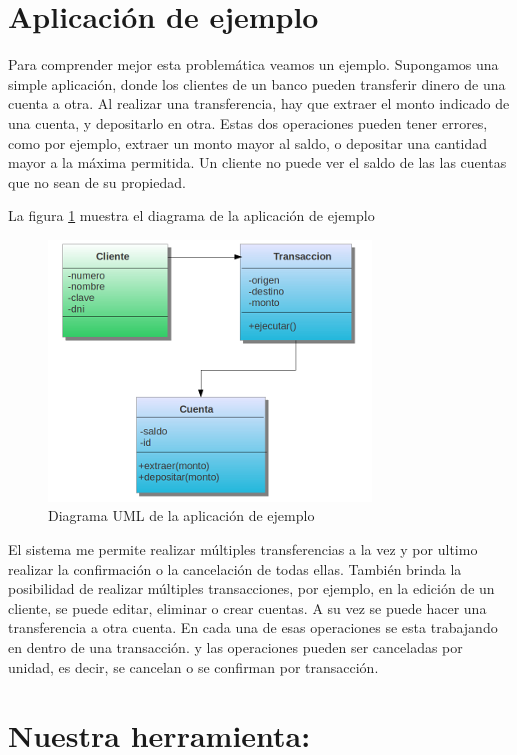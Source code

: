 \section{Aplicación de ejemplo}

Para comprender mejor esta problemática veamos un ejemplo. Supongamos una simple
aplicación, donde los clientes de un banco pueden transferir dinero de
una cuenta a otra. Al realizar una transferencia, hay que extraer el monto
indicado de una cuenta, y depositarlo en otra. Estas dos
operaciones pueden tener errores, como por ejemplo, extraer un monto mayor al
saldo, o depositar una cantidad mayor a la máxima permitida. 
Un cliente no puede ver el saldo de las las cuentas que no sean de su propiedad.

La  figura \ref{example} muestra el diagrama de la aplicación de
ejemplo

	\begin{figure}[h]
		\includegraphics{img/objectTransaction}
		\caption{Diagrama UML de la aplicación de ejemplo}
		\label{example}
	\end{figure}	


El sistema me permite realizar múltiples transferencias a la vez y por ultimo
realizar la confirmación o la cancelación de todas ellas. También brinda la posibilidad
de realizar múltiples transacciones, por ejemplo, en la edición de un cliente,
se puede editar, eliminar o crear cuentas. A su vez se puede hacer una
transferencia a otra cuenta. En cada una de esas operaciones se esta
trabajando en dentro de una transacción. y las operaciones pueden ser
canceladas por unidad, es decir, se cancelan o se confirman por transacción.



\section{Nuestra herramienta: }

